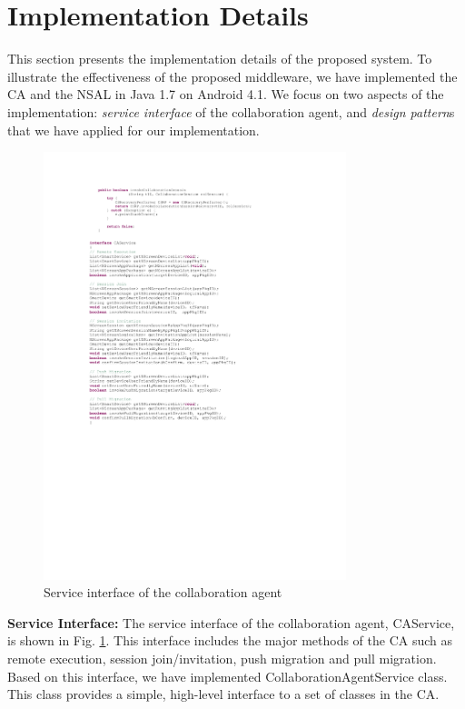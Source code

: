 \documentclass[conference]{IEEEtran}
\begin{document}
\section{Implementation Details}
\label{sc:implementation}
This section presents the implementation details of  the proposed system. 
To illustrate the effectiveness of the proposed middleware, we have implemented the CA and the NSAL in Java 1.7 on Android 4.1. 
We focus on two aspects of the implementation: \textit{service interface} of the collaboration agent, and \textit{design pattern}s 
that we have applied for our implementation.
\begin{figure}[htb] 
\centering
\includegraphics[width=8.8cm,keepaspectratio]{caservice}
\caption{Service interface of the collaboration agent}
\label{fig:caservice}
\end{figure}

\noindent
\textbf{Service Interface:}  The service interface  of the collaboration agent, {\small \sffamily CAService}, is shown in Fig. \ref{fig:caservice}.   This interface includes the major methods of the CA such as remote execution, session join/invitation, push migration and pull migration. Based on this interface, we have implemented {\small \sffamily CollaborationAgentService} class. This class provides a simple,  high-level interface to a set of classes in the CA.\\
\end{document}
